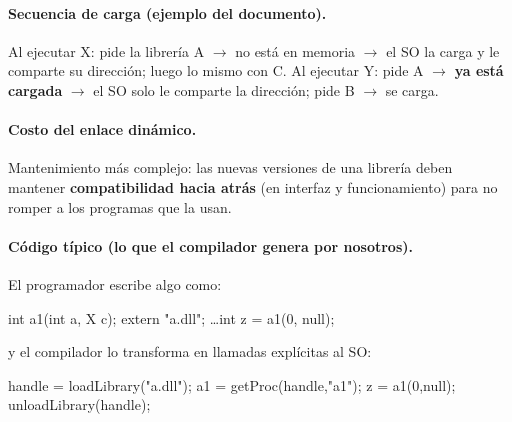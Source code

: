 \documentclass[11pt,letterpaper]{article}
\begin{document}
\begin{center}
\end{center}

\paragraph{Secuencia de carga (ejemplo del documento).} Al ejecutar X: pide la librer\'ia A $\rightarrow$ no est\'a en memoria $\rightarrow$ el SO la carga y le comparte su direcci\'on; luego lo mismo con C. Al ejecutar Y: pide A $\rightarrow$ \textbf{ya est\'a cargada} $\rightarrow$ el SO solo le comparte la direcci\'on; pide B $\rightarrow$ se carga.

\paragraph{Costo del enlace din\'amico.} Mantenimiento m\'as complejo: las nuevas versiones de una librer\'ia deben mantener \textbf{compatibilidad hacia atr\'as} (en interfaz y funcionamiento) para no romper a los programas que la usan.

\paragraph{C\'odigo t\'ipico (lo que el compilador genera por nosotros).}
El programador escribe algo como:
\begin{center}\footnotesize\ttfamily int a1(int a, X c); extern "a.dll"; \quad\dots\quad int z = a1(0, null);\end{center}
y el compilador lo transforma en llamadas expl\'icitas al SO:
\begin{center}\footnotesize\ttfamily
handle = loadLibrary("a.dll"); \; a1 = getProc(handle,"a1"); \; z = a1(0,null); \; unloadLibrary(handle);
\end{center}
\end{document}
